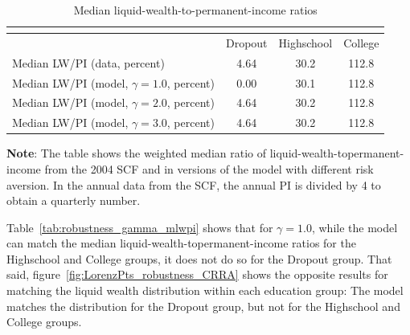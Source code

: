 \documentclass[\econtexRoot/HAFiscal]{subfiles}
\begin{document}
\begin{table}[th]
  \begin{center}
    \begin{tabular}{lccc}
      \multicolumn{4}{l}{} \\ \midrule
      & Dropout & Highschool & College \\ \midrule
      Median LW/PI (data, percent) & 4.64 & 30.2 & 112.8 \\ 
      Median LW/PI (model, $\gamma = 1.0$, percent) & 0.00 & 30.1 & 112.8 \\	
      Median LW/PI (model, $\gamma = 2.0$, percent) & 4.64 & 30.2 & 112.8 \\
      Median LW/PI (model, $\gamma = 3.0$, percent) & 4.64 & 30.2 & 112.8 \\ \bottomrule
    \end{tabular}
    \caption{Median liquid-wealth-to-permanent-income ratios}
    \notinsubfile{\label{tab:robustness_gamma_mlwpi}}	
    \parbox{15cm}{\small \vspace{.05cm} \textbf{Note}: The table shows the weighted median ratio of liquid-wealth-topermanent-income from the 2004 SCF and in versions of the model with different risk aversion. In the annual data from the SCF, the annual PI is divided by 4 to obtain a quarterly number.\normalsize}
  \end{center}
\end{table}

Table~\ref{tab:robustness_gamma_mlwpi} shows that for $\gamma=1.0$, while the model can match the median liquid-wealth-topermanent-income ratios for the Highschool and College groups, it does not do so for the Dropout group. That said, figure~\ref{fig:LorenzPts_robustness_CRRA} shows the opposite results for matching the liquid wealth distribution within each education group: The model matches the distribution for the Dropout group, but not for the Highschool and College groups. 
\end{document}
